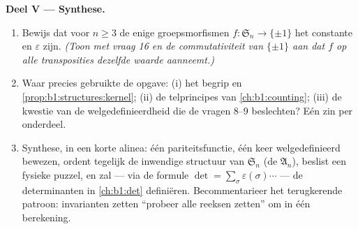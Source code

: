 \begin{problem}
\medskip
\noindent\textbf{Deel V --- Synthese.}
\begin{enumerate}[resume]
  \item Bewijs dat voor $n \geq 3$ de enige groepsmorfismen $f \colon
        \mathfrak S_n \to \{\pm 1\}$ het constante  en
        $\varepsilon$ zijn. \emph{(Toon met vraag 16 en de
        commutativiteit van $\{\pm1\}$ aan dat $f$ op alle transposities
        dezelfde waarde aanneemt.)}
  \item Waar precies gebruikte de opgave: (i) het begrip  en
        \cref{prop:b1:structures:kernel}; (ii) de telprincipes van
        \cref{ch:b1:counting}; (iii) de kwestie van de
        welgedefinieerdheid die de vragen 8--9 beslechten? Eén zin per
        onderdeel.
  \item Synthese, in een korte alinea: één pariteitsfunctie, één keer
        welgedefinieerd bewezen, ordent tegelijk de inwendige structuur
        van $\mathfrak S_n$ (de  $\mathfrak A_n$), beslist een
        fysieke puzzel, en zal --- via de formule $\det = \sum_\sigma
        \varepsilon(\sigma)\cdots$ --- de determinanten in
        \cref{ch:b1:det} definiëren. Becommentarieer het terugkerende
        patroon: invarianten zetten ``probeer alle reeksen zetten'' om in
        één berekening.
\end{enumerate}
\end{problem}
